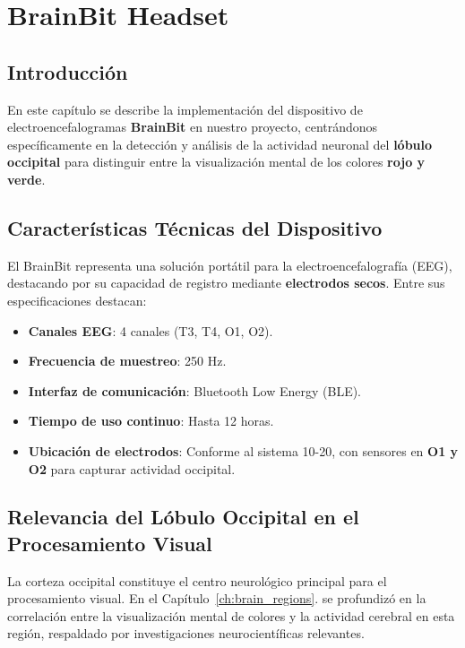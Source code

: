 \chapter{BrainBit Headset}

\section{Introducci\'on}
En este capítulo se describe la implementación del dispositivo de electroencefalogramas \textbf{BrainBit} \cite{brainbit} en nuestro proyecto, centrándonos específicamente en la detección y análisis de la actividad neuronal del \textbf{lóbulo occipital} para distinguir entre la visualización mental de los colores \textbf{rojo y verde}.

\section{Características Técnicas del Dispositivo}
El BrainBit representa una solución portátil para la electroencefalografía (EEG), destacando por su capacidad de registro mediante \textbf{electrodos secos}. Entre sus especificaciones destacan:

    \begin{itemize}
        \item \textbf{Canales EEG}: 4 canales (T3, T4, O1, O2).
        \item \textbf{Frecuencia de muestreo}: 250 Hz.
        \item \textbf{Interfaz de comunicación}: Bluetooth Low Energy (BLE).
        \item \textbf{Tiempo de uso continuo}: Hasta 12 horas.
        \item \textbf{Ubicación de electrodos}: Conforme al sistema 10-20, con sensores en \textbf{O1 y O2} para capturar actividad occipital.
    \end{itemize}

\section{Relevancia del Lóbulo Occipital en el Procesamiento Visual}
La corteza occipital constituye el centro neurológico principal para el procesamiento visual. En el Capítulo~\ref{ch:brain_regions}. se profundizó en la correlación entre la visualización mental de colores y la actividad cerebral en esta región, respaldado por investigaciones neurocientíficas relevantes.

\newpage

